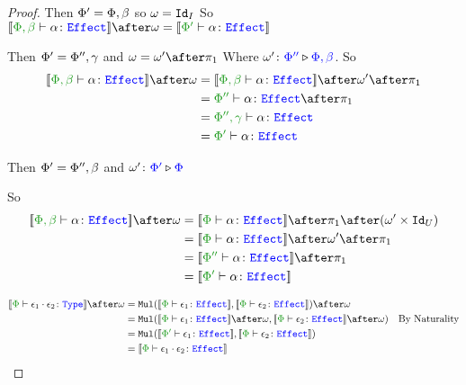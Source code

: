 \documentclass{report}
\begin{document}
\begin{framed}
\begin{proof}
        \subcase{$\w=\i$}
        Then $\Phi' = \Phi,\beta$ so $\omega=\texttt{Id}_{I}$
        So $\deno{\typerelation{\P,\b}{\a}{\effect}}\after\w = \deno{\typerelation{\P'}{\a}{\effect}}$
        
        Then $\Phi' = \Phi'',\gamma$ and $\w=\w'\after\p$
        Where $\omega' \colon {\color{blue}\Phi''} \triangleright {\color {blue} \Phi,\beta}$.
        So
        \begin{align*}
            \deno{\typerelation{\P,\b}{\a}{\effect}}\after\w & = \deno{\typerelation{\P,\b}{\a}{\effect}}\after\w'\after\p\\
            & = {\typerelation{\P''}{\a}{\effect}}\after\p\\
            & = {\typerelation{\P'',\g}{\a}{\effect}}\\
            & = {\typerelation{\P'}{\a}{\effect}}\\
        \end{align*}
        
        Then $\Phi'=\Phi'',\beta$ and $\omega' \colon {\color{blue}\Phi'} \triangleright {\color {blue} \Phi}$
        
        So \begin{align*}
            \deno{\typerelation{\P,\b}{\a}{\effect}}\after\w &= \deno{\typerelation{\P}{\a}{\effect}}\after\p\after(\w'\times\Id{U})\\
            &=\deno{\typerelation{\P}{\a}{\effect}}\after\w'\after\p\\
            & = \deno{\typerelation{\P''}{\a}{\effect}}\after\p\\
            & = \deno{\typerelation{\P'}{\a}{\effect}}\\
        \end{align*}
        
        \begin{align*}
            \deno{\typerelation{\P}{\e_1\dot\e_2}{\type}} \after\w &=
            \Mul(\deno{\typerelation{\P}{\e_1}{\effect}}, \deno{\typerelation{\P}{\e_2}{\effect}})\after \w \\
            & = \Mul(\deno{\typerelation{\P}{\e_1}{\effect}}\after \w, \deno{\typerelation{\P}{\e_2}{\effect}}\after \w)\qt{By Naturality}\\
            & = \Mul(\deno{\typerelation{\P'}{\e_1}{\effect}}, \deno{\typerelation{\P}{\e_2}{\effect}})\\
            & = \deno{\typerelation{\P}{\e_1\dot\e_2}{\effect}}
        \end{align*}
    \end{proof}
    
\end{framed}
\end{document}
